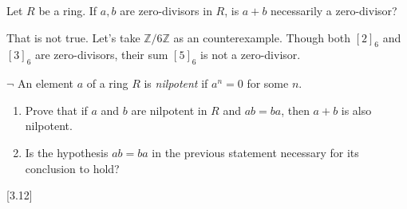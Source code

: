 \documentclass[12pt,letterpaper,boxed]{hmcpset}
\begin{document}
\begin{problem}[1.5]
	Let $R$ be a ring. If $a, b$ are zero-divisors in $R$, is $a+b$ necessarily a zero-divisor?
\end{problem}
\begin{solution}
	That is not true. Let's take $\mathbb{Z}/6\mathbb{Z}$ as an counterexample. Though both $[2]_6$ and $[3]_6$ are zero-divisors, their sum $[5]_6$ is not a zero-divisor.
\end{solution}

\hypertarget{Exercise III.1.6}{}
\begin{problem}[1.6]
	$\neg$ An element $a$ of a ring $R$ is \emph{nilpotent} if $a^n = 0$ for some $n$.
	\begin{enumerate}
	\item Prove that if $a$ and $b$ are nilpotent in $R$ and $ab = ba$, then $a+b$ is also nilpotent.
	\item Is the hypothesis $ab = ba$ in the previous statement necessary for its conclusion to hold?
	\end{enumerate}
[3.12]
\end{problem}
\end{document}
